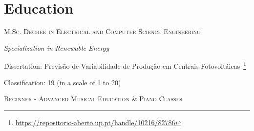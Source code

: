 \documentclass{mycv}
\begin{document}

\vspace{0.5cm}

\section{Education}{

\textsc{M.Sc. Degree in Electrical and Computer Science Engineering}

\textit{Specialization in Renewable Energy}

\begin{myitemize}
	\item Dissertation: Previs\~{a}o de Variabilidade de Produ\c{c}\~{a}o em Centrais Fotovolt\'{a}icas~\footnote{\url{https://repositorio-aberto.up.pt/handle/10216/82786}}
	\begin{myitemize}
		\item Classification: 19 (in a scale of 1 to 20)
	\end{myitemize}
\end{myitemize}


\vspace{0.05cm}

\textsc{Beginner - Advanced Musical Education \& Piano Classes}
\vspace{0.5cm}









\vspace{0.3cm}

}
\end{document}

